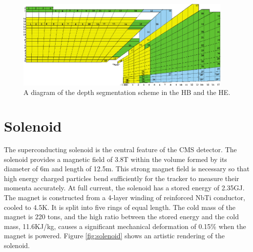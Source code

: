\documentclass[12pt]{thesis}  %
\begin{document}
\begin{figure}[hbt]
\begin{center}
\includegraphics[width=0.95\textwidth]{figures/HCAL_tower_segmentation.pdf}
\caption{A diagram of the depth segmentation scheme in the HB and the HE.}
\label{fig:hcal-depths}
\end{center}
\end{figure}


\section{Solenoid}

The superconducting solenoid is the central feature of the CMS detector. The solenoid provides a magnetic field of 3.8\unit{T} within the volume formed by its diameter of 6\unit{m} and length of 12.5\unit{m}. This strong magnet field is necessary so that high energy charged particles bend sufficiently for the tracker to measure their momenta accurately. At full current, the solenoid has a stored energy of 2.35\unit{GJ}. The magnet is constructed from a 4-layer winding of reinforced NbTi conductor, cooled to 4.5\unit{K}. It is split into five rings of equal length. The cold mass of the magnet is 220 tons, and the high ratio between the stored energy and the cold mass, 11.6\unit{KJ/kg}, causes a significant mechanical deformation of 0.15\% when the magnet is powered. Figure \ref{fig:solenoid} shows an artistic rendering of the solenoid.
\end{document}
